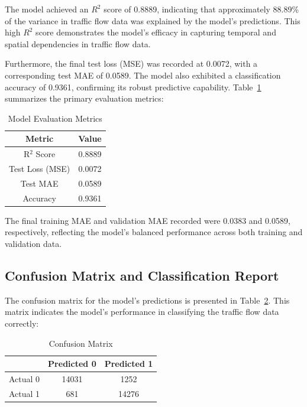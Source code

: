 \documentclass[conference]{IEEEtran}
\begin{document}
The model achieved an \( R^2 \) score of 0.8889, indicating that approximately 88.89\% of the variance in traffic flow data was explained by the model’s predictions. This high \( R^2 \) score demonstrates the model’s efficacy in capturing temporal and spatial dependencies in traffic flow data.

Furthermore, the final test loss (MSE) was recorded at 0.0072, with a corresponding test MAE of 0.0589. The model also exhibited a classification accuracy of 0.9361, confirming its robust predictive capability. Table~\ref{table:metrics} summarizes the primary evaluation metrics:

\begin{table}[htbp]
    \centering
    \caption{Model Evaluation Metrics}
    \begin{tabular}{|c|c|}
        \hline
        Metric & Value \\
        \hline
        R\(^2\) Score & 0.8889 \\
        Test Loss (MSE) & 0.0072 \\
        Test MAE & 0.0589 \\
        Accuracy & 0.9361 \\
        \hline
    \end{tabular}
    \label{table:metrics}
\end{table}

The final training MAE and validation MAE recorded were 0.0383 and 0.0589, respectively, reflecting the model’s balanced performance across both training and validation data.

\subsection{Confusion Matrix and Classification Report}

The confusion matrix for the model’s predictions is presented in Table~\ref{table:confusion_matrix}. This matrix indicates the model's performance in classifying the traffic flow data correctly:

\begin{table}[htbp]
    \centering
    \caption{Confusion Matrix}
    \begin{tabular}{|c|c|c|}
        \hline
        & Predicted 0 & Predicted 1 \\
        \hline
        Actual 0 & 14031 & 1252 \\
        Actual 1 & 681 & 14276 \\
        \hline
    \end{tabular}
    \label{table:confusion_matrix}
\end{table}
\end{document}
